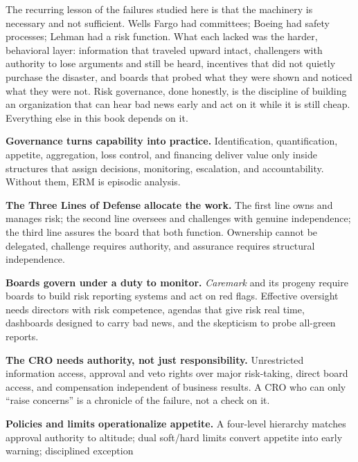 \documentclass[11pt,openany]{book}
\begin{document}
The recurring lesson of the failures studied here is that the machinery is
necessary and not sufficient. Wells Fargo had committees; Boeing had safety
processes; Lehman had a risk function. What each lacked was the harder,
behavioral layer: information that traveled upward intact, challengers with
authority to lose arguments and still be heard, incentives that did not
quietly purchase the disaster, and boards that probed what they were shown
and noticed what they were not. Risk governance, done honestly, is the
discipline of building an organization that can hear bad news early and act
on it while it is still cheap. Everything else in this book depends on it.

\begin{keytakeaways}
  \item \textbf{Governance turns capability into practice.} Identification,
        quantification, appetite, aggregation, loss control, and financing
        deliver value only inside structures that assign decisions,
        monitoring, escalation, and accountability. Without them, ERM is
        episodic analysis.
  \item \textbf{The Three Lines of Defense allocate the work.} The first
        line owns and manages risk; the second line oversees and challenges
        with genuine independence; the third line assures the board that
        both function. Ownership cannot be delegated, challenge requires
        authority, and assurance requires structural independence.
  \item \textbf{Boards govern under a duty to monitor.} \emph{Caremark} and
        its progeny require boards to build risk reporting systems and act
        on red flags. Effective oversight needs directors with risk
        competence, agendas that give risk real time, dashboards designed to
        carry bad news, and the skepticism to probe all-green reports.
  \item \textbf{The CRO needs authority, not just responsibility.}
        Unrestricted information access, approval and veto rights over major
        risk-taking, direct board access, and compensation independent of
        business results. A CRO who can only ``raise concerns'' is a
        chronicle of the failure, not a check on it.
  \item \textbf{Policies and limits operationalize appetite.} A four-level
        hierarchy matches approval authority to altitude; dual soft/hard
        limits convert appetite into early warning; disciplined exception

\end{keytakeaways}
\end{document}
